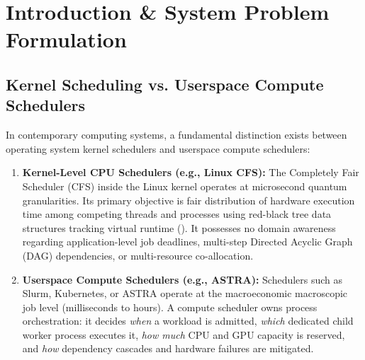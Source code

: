 \documentclass[11pt,a4paper]{article}
\DeclareRobustCommand{\code}[1]{\texttt{\detokenize{#1}}}
\begin{document}
\tableofcontents
\newpage

\section{Introduction \& System Problem Formulation}

\subsection{Kernel Scheduling vs. Userspace Compute Schedulers}
In contemporary computing systems, a fundamental distinction exists between operating system kernel schedulers and userspace compute schedulers:
\begin{enumerate}[leftmargin=*]
    \item \textbf{Kernel-Level CPU Schedulers (e.g., Linux CFS):} The Completely Fair Scheduler (CFS) inside the Linux kernel operates at microsecond quantum granularities. Its primary objective is fair distribution of hardware execution time among competing threads and processes using red-black tree data structures tracking virtual runtime (\code{vruntime}). It possesses no domain awareness regarding application-level job deadlines, multi-step Directed Acyclic Graph (DAG) dependencies, or multi-resource co-allocation.
    \item \textbf{Userspace Compute Schedulers (e.g., ASTRA):} Schedulers such as Slurm, Kubernetes, or ASTRA operate at the macroeconomic macroscopic job level (milliseconds to hours). A compute scheduler owns process orchestration: it decides \textit{when} a workload is admitted, \textit{which} dedicated child worker process executes it, \textit{how much} CPU and GPU capacity is reserved, and \textit{how} dependency cascades and hardware failures are mitigated.
\end{enumerate}
\end{document}
